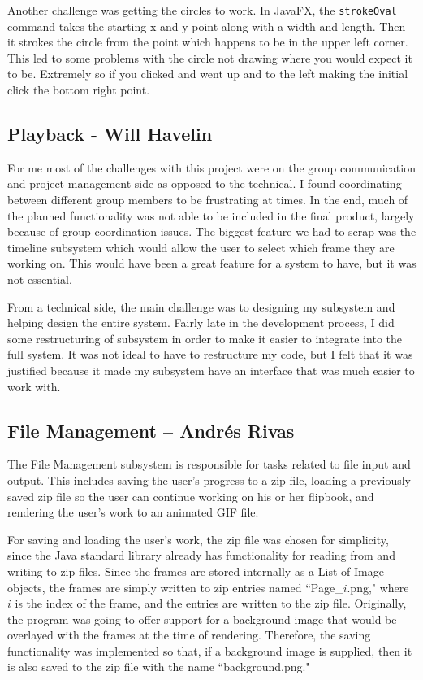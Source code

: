 \documentclass[10 pt]{scrartcl}
\begin{document}
Another challenge was getting the circles to work. In JavaFX, the \verb|strokeOval| command takes the starting x and y point along with a width and length. Then it strokes the circle from the point which happens to be in the upper left corner. This led to some problems with the circle not drawing where you would expect it to be. Extremely so if you clicked and went up and to the left making the initial click the bottom right point.

\subsection{Playback - Will Havelin}

For me most of the challenges with this project were on the group communication and project management side as opposed to the technical. I found coordinating between different group members to be frustrating at times. In the end, much of the planned functionality was not able to be included in the final product, largely because of group coordination issues.  The biggest feature we had to scrap was the timeline subsystem which would allow the user to select which frame they are working on. This would have been a great feature for a system to have, but it was not essential.

From a technical side, the main challenge was to designing my subsystem and helping design the entire
system. Fairly late in the development process, I did some restructuring of subsystem in order to make
it easier to integrate into the full system. It was not ideal to have to restructure my code, but I felt that
it was justified because it made my subsystem have an interface that was much easier to work with.

\subsection{File Management -- Andr\'{e}s Rivas}

The File Management subsystem is responsible for tasks related to file input and output. This includes saving the user's progress to a zip file, loading a previously saved zip file so the user can continue working on his or her flipbook, and rendering the user's work to an animated GIF file.

For saving and loading the user's work, the zip file was chosen for simplicity, since the Java standard library already has functionality for reading from and writing to zip files. Since the frames are stored internally as a List of Image objects, the frames are simply written to zip entries named ``Page\_$i$.png," where $i$ is the index of the frame, and the entries are written to the zip file. Originally, the program was going to offer support for a background image that would be overlayed with the frames at the time of rendering. Therefore, the saving functionality was implemented so that, if a background image is supplied, then it is also saved to the zip file with the name ``background.png."
\end{document}
